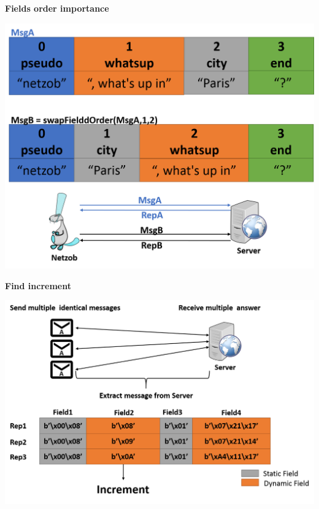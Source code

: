 \documentclass{beamer}
\newcounter{m} %
\newcounter{c} %
\begin{document}
\begin{frame}{\bf Fields order importance}
\begin{center}
\includegraphics[scale=0.25]{swapFieldOrder.png}
\end{center}
\end{frame}

\begin{frame}{\bf Find increment}
\begin{center}
\includegraphics[scale=0.3]{incrementation.png}
\end{center}
\end{frame}
\end{document}

